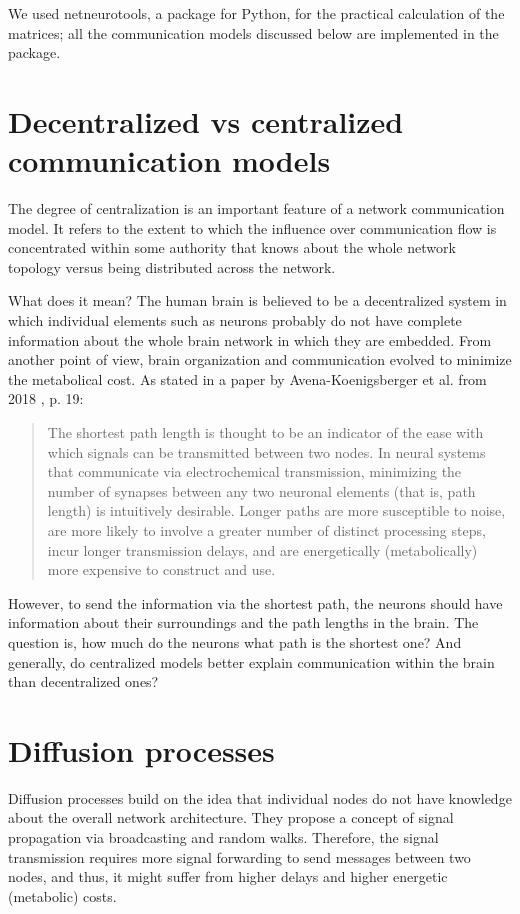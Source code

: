 We used netneurotools, a package for Python, for the practical calculation of the matrices; all the communication models discussed below are implemented in the package.

\section{Decentralized vs centralized communication models}

The degree of centralization is an important feature of a network communication model. It refers to the extent to which the influence over communication flow is concentrated within some authority that knows about the whole network topology versus being distributed across the network. \cite{seguin_brain_2023}

What does it mean? The human brain is believed to be a decentralized system in which individual elements such as neurons probably do not have complete information about the whole brain network in which they are embedded. \cite{seguin_brain_2023} From another point of view, brain organization and communication evolved to minimize the metabolical cost. \cite{bullmore_economy_2012} As stated in a paper by Avena-Koenigsberger et al. from 2018 \cite{avena-koenigsberger_communication_2018}, p. 19:
\begin{quote}
The shortest path length is thought to be an indicator of the ease with which signals can be transmitted between two nodes. In neural systems that communicate via electrochemical transmission, minimizing the number of synapses between any two neuronal elements (that is, path length) is intuitively desirable. Longer paths are more susceptible to noise, are more likely to involve a greater number of distinct processing steps, incur longer transmission delays, and are energetically (metabolically) more expensive to construct and use.
\end{quote}
However, to send the information via the shortest path, the neurons should have information about their surroundings and the path lengths in the brain. The question is, how much do the neurons  what path is the shortest one? And generally, do centralized models better explain communication within the brain than decentralized ones?

\section{Diffusion processes}

Diffusion processes build on the idea that individual nodes do not have knowledge about the overall network architecture. They propose a concept of signal propagation via broadcasting and random walks. Therefore, the signal transmission requires more signal forwarding to send messages between two nodes, and thus, it might suffer from higher delays and higher energetic (metabolic) costs. \cite{seguin_brain_2023}

